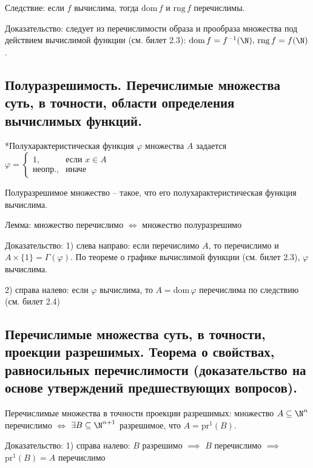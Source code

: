 \documentclass[a4paper, 10pt]{article}
\newcommand{\dom}{\text{dom}\,}
\newcommand{\rng}{\text{rng}\,}
\newcommand{\pr}{\text{pr}}
\begin{document}
\hfill

Следствие: если $f$ вычислима, тогда $\dom f$ и $\rng f$ перечислимы.

Доказательство: следует из перечислимости образа и прообраза множества под действием вычислимой функции (см. билет 2.3): $\dom f=f^{-1}(\N),\,\rng f=f(\N)$.

\subsection{Полуразрешимость. Перечислимые множества суть, в точности, области определения вычислимых функций.}

*Полухарактеристическая функция $\varphi$ множества $A$ задается $\varphi = \begin{cases}
    1,&\text{если } x\in A \\ \text{неопр.,}&\text{иначе}
\end{cases}$ 

Полуразрешимое множество -- такое, что его полухарактеристическая функция вычислима.

Лемма: множество перечислимо $\iff$ множество полуразрешимо

Доказательство: 1) слева направо: если перечислимо $A$, то перечислимо и $A\times\{1\}=\Gamma(\varphi)$. По теореме о графике вычислимой функции (см. билет 2.3), $\varphi$ вычислима.

2) справа налево: если $\varphi$ вычислима, то $A=\dom\varphi$ перечислима по следствию (см. билет 2.4)

\subsection{Перечислимые множества суть, в точности, проекции разрешимых. Теорема о свойствах, равносильных перечислимости (доказательство на основе утверждений предшествующих вопросов).}

Перечислимые множества в точности проекции разрешимых: множество $A\subseteq\N^n$ перечислимо $\iff$ $\exists B\subseteq\N^{n+1}$ разрешимое, что $A=\pr^1(B)$.

Доказательство: 1) справа налево: $B$ разрешимо $\implies$ $B$ перечислимо $\implies$ $\pr^1(B)=A$ перечислимо
\end{document}

